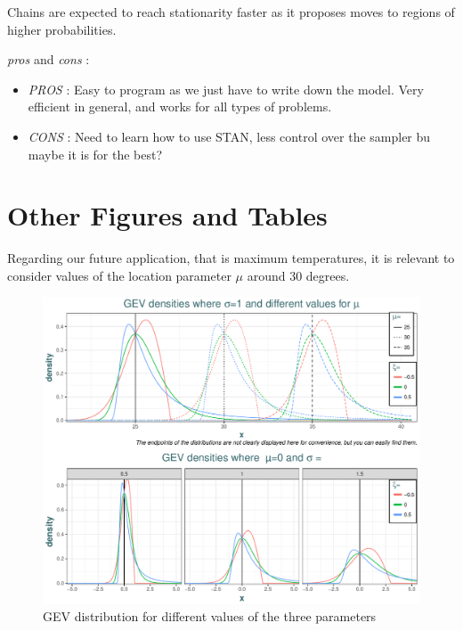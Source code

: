 Chains are expected to reach stationarity faster as it proposes moves to regions of higher probabilities.


\emph{pros} and \emph{cons} : 

\begin{itemize}
	\item \emph{PROS} : Easy to program as we just have to write down the model. Very efficient in general, and works for all types of problems.
	\item \emph{CONS} : Need to learn how to use STAN, less control over the sampler bu maybe it is for the best?
\end{itemize}


\chapter{Other Figures and Tables}\label{app:fig}


Regarding our future application, that is maximum temperatures, it is relevant to consider values of the location parameter $\mu$ around 30 degrees. 


\begin{figure}[!htb]
	\includegraphics[width=\linewidth]{gevdif.pdf}\caption{GEV distribution for different values of the three parameters }\label{fig:gevdif}
\end{figure}


